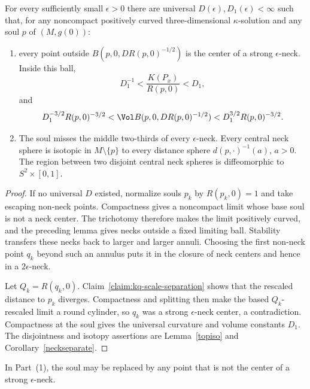 \begin{proposition}\label{prop:uniform-neck-structure-constants}
\label{uniformD}
For every sufficiently small $\epsilon>0$ there are universal
$D(\epsilon),D_1(\epsilon)<\infty$ such that, for any noncompact
positively curved three-dimensional $\kappa$-solution and any soul
$p$ of $(M,g(0))$:
\begin{enumerate}
\item[(1)] every point outside
$B(p,0,DR(p,0)^{-1/2})$ is the center of a strong
$\epsilon$-neck. Inside this ball,
\[
 D_1^{-1}<\frac{K(P_x)}{R(p,0)}<D_1,
\]
and
\[
 D_1^{-3/2}R(p,0)^{-3/2}
 <\Vol B(p,0,DR(p,0)^{-1/2})
 <D_1^{3/2}R(p,0)^{-3/2}.
\]
\item[(2)] The soul misses the middle two-thirds of every
$\epsilon$-neck. Every central neck sphere is isotopic in
$M\setminus\{p\}$ to every distance sphere $d(p,\cdot)^{-1}(a)$,
$a>0$. The region between two disjoint central neck spheres is
diffeomorphic to $S^2\times[0,1]$.
\end{enumerate}
\end{proposition}
\begin{proof}
\sketch
{}
If no universal $D$ existed, normalize souls $p_k$ by
$R(p_k,0)=1$ and take escaping non-neck points. Compactness gives a
noncompact limit whose base soul is not a neck center. The trichotomy
therefore makes the limit positively curved, and the preceding lemma
gives necks outside a fixed limiting ball. Stability transfers these
necks back to larger and larger annuli. Choosing the first
non-neck point $q_k$ beyond such an annulus puts it in the closure of
neck centers and hence in a $2\epsilon$-neck.

Let $Q_k=R(q_k,0)$. Claim~\ref{claim:kq-scale-separation} shows that
the rescaled distance to $p_k$ diverges. Compactness and splitting
then make the based $Q_k$-rescaled limit a round cylinder, so $q_k$
was a strong $\epsilon$-neck center, a contradiction. Compactness at
the soul gives the universal curvature and volume constants $D_1$.
The disjointness and isotopy assertions are Lemma~\ref{topiso} and
Corollary~\ref{neckseparate}.
\end{proof}

\begin{remark}\label{rem:uniform-neck-structure-basepoint-remark}
In Part~(1), the soul may be replaced by any point that is not the
center of a strong $\epsilon$-neck.
\end{remark}

